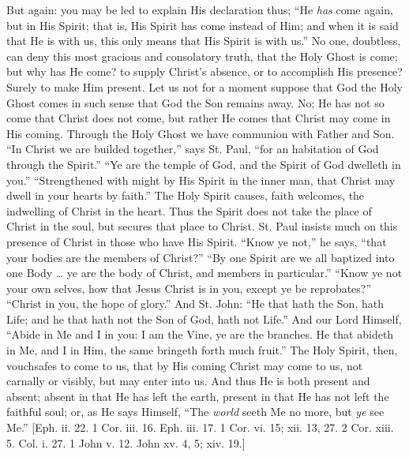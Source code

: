 But again: you may be led to explain His declaration thus; ``He \emph{has}
come again, but in His Spirit; that is, His Spirit has come instead of
Him; and when it is said that He is with us, this only means that His
Spirit is with us.'' No one, doubtless, can deny this most gracious
and consolatory truth, that the Holy Ghost is come; but why has He come?
to supply Christ's absence, or to accomplish His presence? Surely to
make Him present. Let us not for a moment suppose that God the Holy
Ghost comes in such sense that God the Son remains away. No; He has not
so come that Christ does not come, but rather He comes that Christ may
come in His coming. Through the Holy Ghost we have communion with Father
and Son. ``In Christ we are builded together,'' says St. Paul,
``for an habitation of God through the Spirit.'' ``Ye are
the temple of God, and the Spirit of God dwelleth in you.''
``Strengthened with might by His Spirit in the inner man, that
Christ may dwell in your hearts by faith.'' The Holy Spirit causes,
faith welcomes, the indwelling of Christ in the heart. Thus the Spirit
does not take the place of Christ in the soul, but secures that place to
Christ. St. Paul insists much on this presence of Christ in those who
have His Spirit. ``Know ye not,'' he says, ``that your
bodies are the members of Christ?'' ``By one Spirit are we all
baptized into one Body … ye are the body of Christ, and members in
particular.'' ``Know ye not your own selves, how that Jesus
Christ is in you, except ye be reprobates?'' ``Christ in you,
the hope of glory.'' And St. John: ``He that hath the Son, hath
Life; and he that hath not the Son of God, hath not Life.'' And our
Lord Himself, ``Abide in Me and I in you: I am the Vine, ye are the
branches. He that abideth in Me, and I in Him, the same bringeth forth
much fruit.'' The Holy Spirit, then, vouchsafes to come to us, that
by His coming Christ may come to us, not carnally or visibly, but may
enter into us. And thus He is both present and absent; absent in that He
has left the earth, present in that He has not left the faithful soul;
or, as He says Himself, ``The \emph{world} seeth Me no more, but \emph{ye}
see Me.'' [Eph. ii. 22. 1 Cor. iii. 16. Eph. iii. 17. 1 Cor. vi. 15;
xii. 13, 27. 2 Cor. xiii. 5. Col. i. 27. 1 John v. 12. John xv. 4, 5;
xiv. 19.]


